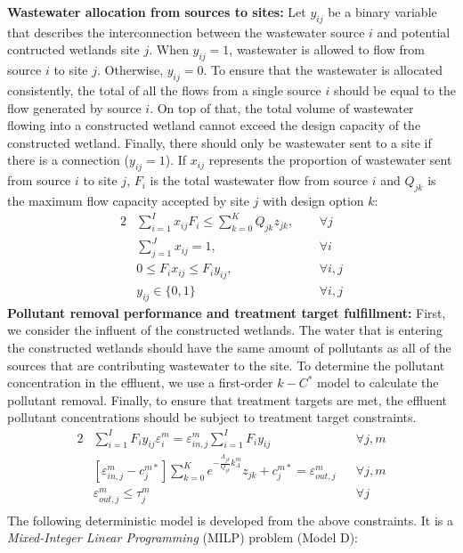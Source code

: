 \documentclass[preprint,12pt,authoryear]{elsarticle}
\begin{document}
\textbf{Wastewater allocation from sources to sites:} Let $y_{ij}$ be a binary variable that describes the interconnection between the wastewater source $i$ and potential contructed wetlands site $j$. When $y_{ij} = 1$, wastewater is allowed to flow from source $i$ to site $j$. Otherwise, $y_{ij} = 0$. To ensure that the wastewater is allocated consistently, the total of all the flows from a single source $i$ should be equal to the flow generated by source $i$. On top of that, the total volume of wastewater flowing into a constructed wetland cannot exceed the design capacity of the constructed wetland. Finally, there should only be wastewater sent to a site if there is a connection ($y_{ij} = 1$). If $x_{ij}$ represents the proportion of wastewater sent from source $i$ to site $j$, $F_{i}$ is the total wastewater flow from source $i$ and $Q_{jk}$ is the maximum flow capacity accepted by site $j$ with design option $k$:
\begin{alignat*}{2}
    &\sum_{i=1}^{I}x_{ij}F_{i}\leq \sum_{k=0}^{K}Q_{jk}z_{jk},~~ &&\forall j\label{eq:CWcapacity}\\
	&\sum_{j=1}^{J}x_{ij}=1, &&\forall i \nonumber\\
	&0 \leq F_ix_{ij}\leq F_iy_{ij},&&\forall i,j\nonumber\\
	& y_{ij}\in\{0,1\}&&\forall i,j\nonumber
\end{alignat*}
\textbf{Pollutant removal performance and treatment target fulfillment:} First, we consider the influent of the constructed wetlands. The water that is entering the constructed wetlands should have the same amount of pollutants as all of the sources that are contributing wastewater to the site. To determine the pollutant concentration in the effluent, we use a first-order $k-C^*$ model \citep{rousseau2004model} to calculate the pollutant removal. Finally, to ensure that treatment targets are met, the effluent pollutant concentrations should be subject to treatment target constraints. 
\begin{alignat*}{2}
	&{\sum_{i=1}^{I}F_{i}y_{ij}\varepsilon_{i}^{m}} = \varepsilon_{in,j}^{m}{\sum_{i=1}^{I}F_{i}y_{ij}} &&\forall j,m\\
	&[\varepsilon_{in,j}^{m}-{c}_{j}^{m*}]\sum_{k=0}^{K}e^{-\frac{A_{jk}}{Q_{jk}}k_{A}^{m}}z_{jk}+c_{j}^{m*} = \varepsilon_{out,j}^{m} &&\forall j,m\\
	&\varepsilon_{out,j}^{m}\leq \tau_{j}^{m}~~~&&\forall j\\
\end{alignat*}
The following deterministic model is developed from the above constraints. It is a \emph{Mixed-Integer Linear Programming} (MILP) problem (Model D):
\end{document}
